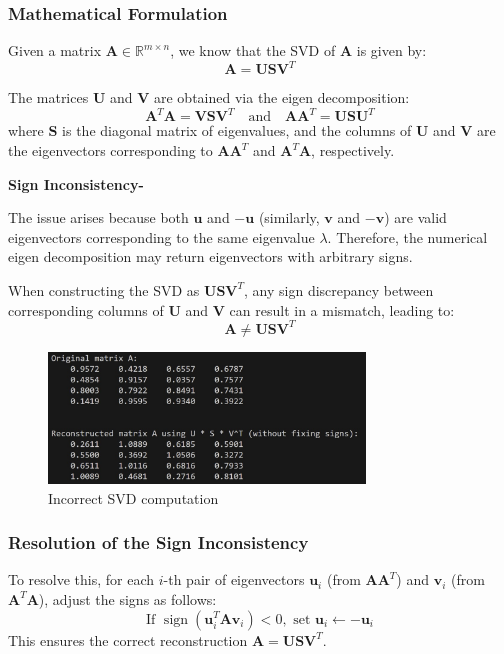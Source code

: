 \documentclass{article}
\begin{document}
\subsubsection*{Mathematical Formulation}
Given a matrix \( \mathbf{A} \in \mathbb{R}^{m \times n} \), we know that the SVD of \( \mathbf{A} \) is given by:
\[
\mathbf{A} = \mathbf{U} \mathbf{S} \mathbf{V}^T
\]

The matrices \( \mathbf{U} \) and \( \mathbf{V} \) are obtained via the eigen decomposition:
\[
\mathbf{A}^T \mathbf{A} = \mathbf{V} \mathbf{S} \mathbf{V}^T \quad \text{and} \quad \mathbf{A} \mathbf{A}^T = \mathbf{U} \mathbf{S} \mathbf{U}^T
\]
where \( \mathbf{S} \) is the diagonal matrix of eigenvalues, and the columns of \( \mathbf{U} \) and \( \mathbf{V} \) are the eigenvectors corresponding to \( \mathbf{A} \mathbf{A}^T \) and \( \mathbf{A}^T \mathbf{A} \), respectively.

\textbf{Sign Inconsistency-}

The issue arises because both \( \mathbf{u} \) and \( -\mathbf{u} \) (similarly, \( \mathbf{v} \) and \( -\mathbf{v} \)) are valid eigenvectors corresponding to the same eigenvalue \( \lambda \). Therefore, the numerical eigen decomposition may return eigenvectors with arbitrary signs. 

When constructing the SVD as \( \mathbf{U} \mathbf{S} \mathbf{V}^T \), any sign discrepancy between corresponding columns of \( \mathbf{U} \) and \( \mathbf{V} \) can result in a mismatch, leading to:
\[
\mathbf{A} \neq \mathbf{U} \mathbf{S} \mathbf{V}^T
\]

\begin{figure}[!htb]
    \centering
    \includegraphics[width=0.75\textwidth]{svd_error.jpg}
    \caption{Incorrect SVD computation}
\end{figure}

\subsubsection*{Resolution of the Sign Inconsistency}
To resolve this, for each \( i \)-th pair of eigenvectors \( \mathbf{u}_i \) (from \( \mathbf{A} \mathbf{A}^T \)) and \( \mathbf{v}_i \) (from \( \mathbf{A}^T \mathbf{A} \)), adjust the signs as follows:
\[
\text{If } \operatorname{sign}(\mathbf{u}_i^T \mathbf{A} \mathbf{v}_i) < 0, \text{ set } \mathbf{u}_i \leftarrow -\mathbf{u}_i
\]
This ensures the correct reconstruction \( \mathbf{A} = \mathbf{U} \mathbf{S} \mathbf{V}^T \).
\end{document}
